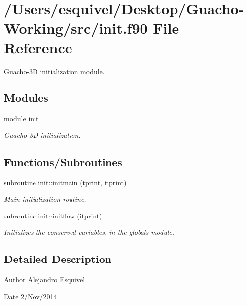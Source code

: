 \hypertarget{init_8f90}{}\section{/\+Users/esquivel/\+Desktop/\+Guacho-\/\+Working/src/init.f90 File Reference}
\label{init_8f90}


Guacho-\/3\+D initialization module.  


\subsection*{Modules}
\begin{DoxyCompactItemize}
\item 
module \hyperlink{namespaceinit}{init}
\begin{DoxyCompactList}\small\item\em Guacho-\/3\+D initialization. \end{DoxyCompactList}\end{DoxyCompactItemize}
\subsection*{Functions/\+Subroutines}
\begin{DoxyCompactItemize}
\item 
subroutine \hyperlink{namespaceinit_a60b4d8ee577d59490c7d351b73253a99}{init\+::initmain} (tprint, itprint)
\begin{DoxyCompactList}\small\item\em Main initialization routine. \end{DoxyCompactList}\item 
subroutine \hyperlink{namespaceinit_ab5415b25da1a9e732d3f557f4d6008b9}{init\+::initflow} (itprint)
\begin{DoxyCompactList}\small\item\em Initializes the conserved variables, in the globals module. \end{DoxyCompactList}\end{DoxyCompactItemize}


\subsection{Detailed Description}
\begin{DoxyAuthor}{Author}
Alejandro Esquivel 
\end{DoxyAuthor}
\begin{DoxyDate}{Date}
2/\+Nov/2014 
\end{DoxyDate}
